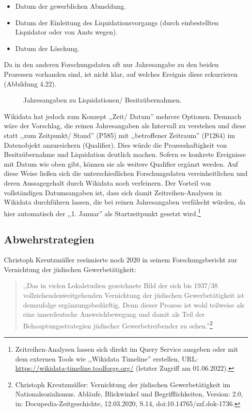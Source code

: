 \begin{itemize}
    \item Datum der gewerblichen Abmeldung.
    \item Datum der Einleitung des Liquidationsvorgangs (durch einbestellten Liquidator oder von Amts wegen).
    \item Datum der Löschung.
\end{itemize}

Da in den anderen Forschungsdaten oft nur Jahresangabe zu den beiden Prozessen vorhanden sind, ist nicht klar, auf welches Ereignis diese rekurrieren (Abbildung 4.22).   

\begin{figure}[h]
    \centering
    \caption{Jahresangaben zu Liquidationen/ Besitzübernahmen.}
    \label{fig:x cubed graph}
\end{figure}

Wikidata hat jedoch zum Konzept ,,Zeit/ Datum'' mehrere Optionen. Demnach wäre der Vorschlag, die reinen Jahresangaben als Intervall zu verstehen und diese statt ,,zum Zeitpunkt/ Stand'' (P585) mit ,,betroffener Zeitraum'' (P1264) im Datenobjekt anzureichern (Qualifier). Dies würde die Prozesshaftigkeit von Besitzübernahme und Liquidation deutlich machen. Sofern es konkrete Ereignisse mit Datum wie oben gibt, können sie als weitere Qualifier ergänzt werden. Auf diese Weise ließen sich die unterschiedlichen Forschungsdaten vereinheitlichen und deren Aussagegehalt durch Wikidata noch verfeinern. Der Vorteil von vollständigen Datumsangaben ist, dass sich damit Zeitreihen-Analysen in Wikidata durchführen lassen, die bei reinen Jahresangaben verfälscht würden, da hier automatisch der ,,1. Januar'' als Startzeitpunkt gesetzt wird.\footnote{Zeitreihen-Analysen lassen sich direkt im Query Service ausgeben oder mit dem externen Tools wie ,,Wikidata Timeline'' erstellen, URL: \url{https://wikidata-timeline.toolforge.org/} (letzter Zugriff am 01.06.2022).} 


\subsection{Abwehrstrategien}

Christoph Kreutzmüller resümierte noch 2020 in seinem Forschungsbericht zur Vernichtung der jüdischen Gewerbetätigkeit:

\begin{quote}
    ,,Das in vielen Lokalstudien gezeichnete Bild der sich bis 1937/38 vollziehendenweitgehenden Vernichtung der jüdischen Gewerbetätigkeit ist demzufolge ergänzungsbedürftig. Denn dieser Prozess ist wohl teilweise als eine innerdeutsche Ausweichbewegung und damit als Teil der Behauptungsstrategien jüdischer Gewerbetreibender zu sehen.''\footnote{Christoph Kreutzmüller: Vernichtung der jüdischen Gewerbetätigkeit im Nationalsozialismus. Abläufe, Blickwinkel und Begrifflichkeiten, Version: 2.0, in: Docupedia-Zeitgeschichte, 12.03.2020, S.14, doi:10.14765/zzf.dok-1736.}
\end{quote}

